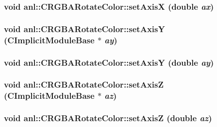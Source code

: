 \label{classanl_1_1CRGBARotateColor_a95761cf5c645d05e3351a0e71a215dbb}
\hypertarget{classanl_1_1CRGBARotateColor_a69d6eef8731b113e1722c2c104f407e0}{
\subsubsection[{setAxisX}]{\setlength{\rightskip}{0pt plus 5cm}void anl::CRGBARotateColor::setAxisX (double {\em ax})}}
\label{classanl_1_1CRGBARotateColor_a69d6eef8731b113e1722c2c104f407e0}
\hypertarget{classanl_1_1CRGBARotateColor_a1bd35b5e08daec00b5738f5edf7858c5}{
\subsubsection[{setAxisY}]{\setlength{\rightskip}{0pt plus 5cm}void anl::CRGBARotateColor::setAxisY ({\bf CImplicitModuleBase} $\ast$ {\em ay})}}
\label{classanl_1_1CRGBARotateColor_a1bd35b5e08daec00b5738f5edf7858c5}
\hypertarget{classanl_1_1CRGBARotateColor_a43a568c40902d750d8acbe7e54a77c99}{
\subsubsection[{setAxisY}]{\setlength{\rightskip}{0pt plus 5cm}void anl::CRGBARotateColor::setAxisY (double {\em ay})}}
\label{classanl_1_1CRGBARotateColor_a43a568c40902d750d8acbe7e54a77c99}
\hypertarget{classanl_1_1CRGBARotateColor_abcfdbcacc808c942fa5f914ac2e4ae5c}{
\subsubsection[{setAxisZ}]{\setlength{\rightskip}{0pt plus 5cm}void anl::CRGBARotateColor::setAxisZ ({\bf CImplicitModuleBase} $\ast$ {\em az})}}
\label{classanl_1_1CRGBARotateColor_abcfdbcacc808c942fa5f914ac2e4ae5c}
\hypertarget{classanl_1_1CRGBARotateColor_a71bfd35d567570db66260cf687bc4fb0}{
\subsubsection[{setAxisZ}]{\setlength{\rightskip}{0pt plus 5cm}void anl::CRGBARotateColor::setAxisZ (double {\em az})}}
